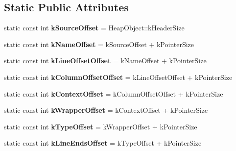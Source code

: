 \subsection*{Static Public Attributes}
\begin{DoxyCompactItemize}
\item 
static const int {\bfseries k\+Source\+Offset} = Heap\+Object\+::k\+Header\+Size\hypertarget{classv8_1_1internal_1_1_script_a225adb25596f83c8821fe3eabd39c511}{}\label{classv8_1_1internal_1_1_script_a225adb25596f83c8821fe3eabd39c511}

\item 
static const int {\bfseries k\+Name\+Offset} = k\+Source\+Offset + k\+Pointer\+Size\hypertarget{classv8_1_1internal_1_1_script_a40ff6e23759cd2b3a04ecf027325ce78}{}\label{classv8_1_1internal_1_1_script_a40ff6e23759cd2b3a04ecf027325ce78}

\item 
static const int {\bfseries k\+Line\+Offset\+Offset} = k\+Name\+Offset + k\+Pointer\+Size\hypertarget{classv8_1_1internal_1_1_script_a956dac18eae162c1b27233b8dde59f24}{}\label{classv8_1_1internal_1_1_script_a956dac18eae162c1b27233b8dde59f24}

\item 
static const int {\bfseries k\+Column\+Offset\+Offset} = k\+Line\+Offset\+Offset + k\+Pointer\+Size\hypertarget{classv8_1_1internal_1_1_script_a07bdb4450a61351c14c57340cb433def}{}\label{classv8_1_1internal_1_1_script_a07bdb4450a61351c14c57340cb433def}

\item 
static const int {\bfseries k\+Context\+Offset} = k\+Column\+Offset\+Offset + k\+Pointer\+Size\hypertarget{classv8_1_1internal_1_1_script_aa5f92f3d5a8070ff039dd47e866d942e}{}\label{classv8_1_1internal_1_1_script_aa5f92f3d5a8070ff039dd47e866d942e}

\item 
static const int {\bfseries k\+Wrapper\+Offset} = k\+Context\+Offset + k\+Pointer\+Size\hypertarget{classv8_1_1internal_1_1_script_a1a469ce1fd98e3243c5c93e23d8af841}{}\label{classv8_1_1internal_1_1_script_a1a469ce1fd98e3243c5c93e23d8af841}

\item 
static const int {\bfseries k\+Type\+Offset} = k\+Wrapper\+Offset + k\+Pointer\+Size\hypertarget{classv8_1_1internal_1_1_script_a209c86d068d81195af0c6382f771f5ae}{}\label{classv8_1_1internal_1_1_script_a209c86d068d81195af0c6382f771f5ae}

\item 
static const int {\bfseries k\+Line\+Ends\+Offset} = k\+Type\+Offset + k\+Pointer\+Size\hypertarget{classv8_1_1internal_1_1_script_a4ad5125df9cf76582ea2a70b11c70bba}{}\label{classv8_1_1internal_1_1_script_a4ad5125df9cf76582ea2a70b11c70bba}


\end{DoxyCompactItemize}

